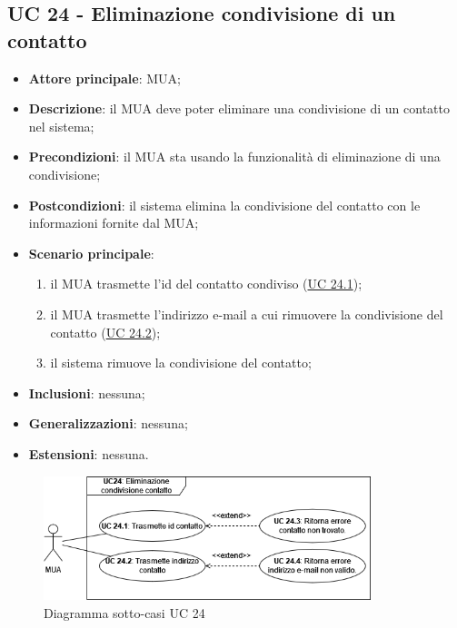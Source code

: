 \subsection{UC 24 - Eliminazione condivisione di un contatto} \label{sec:UC24}

    \begin{itemize}
        \item \textbf{Attore principale}: MUA;
        \item \textbf{Descrizione}: il MUA deve poter eliminare una condivisione di un contatto nel sistema;
        \item \textbf{Precondizioni}: il MUA sta usando la funzionalità di eliminazione di una condivisione;
        \item \textbf{Postcondizioni}: il sistema elimina la condivisione del contatto con le informazioni fornite dal MUA;
        \item \textbf{Scenario principale}:
            \begin{enumerate}
                \item il MUA trasmette l'id del contatto condiviso (\hyperref[sec:UC24.1]{UC 24.1});
                \item il MUA trasmette l'indirizzo e-mail a cui rimuovere la condivisione del contatto (\hyperref[sec:UC24.2]{UC 24.2});
                \item il sistema rimuove la condivisione del contatto;
            \end{enumerate}
        \item \textbf{Inclusioni}: nessuna;
        \item \textbf{Generalizzazioni}: nessuna;
        \item \textbf{Estensioni}: nessuna.
    \end{itemize}

    \begin{figure}[H]
        \includegraphics[width=0.85\textwidth]{sections/uc_imgs/UC24.png}
        \centering
        \caption{Diagramma sotto-casi UC 24}
    \end{figure}

